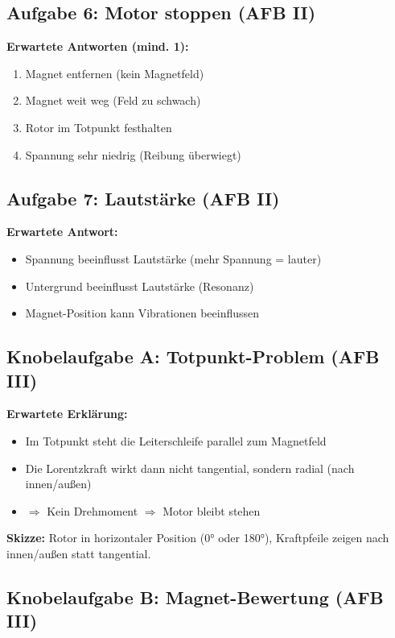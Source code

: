 \documentclass[11pt, a4paper]{article}
\begin{document}
\subsection*{Aufgabe 6: Motor stoppen (AFB II)}

\textbf{Erwartete Antworten (mind. 1):}
\begin{enumerate}[noitemsep]
    \item Magnet entfernen (kein Magnetfeld)
    \item Magnet weit weg (Feld zu schwach)
    \item Rotor im Totpunkt festhalten
    \item Spannung sehr niedrig (Reibung überwiegt)
\end{enumerate}

\subsection*{Aufgabe 7: Lautstärke (AFB II)}

\textbf{Erwartete Antwort:}
\begin{itemize}[noitemsep]
    \item Spannung beeinflusst Lautstärke (mehr Spannung = lauter)
    \item Untergrund beeinflusst Lautstärke (Resonanz)
    \item Magnet-Position kann Vibrationen beeinflussen
\end{itemize}

\subsection*{Knobelaufgabe A: Totpunkt-Problem (AFB III)}

\textbf{Erwartete Erklärung:}
\begin{itemize}[noitemsep]
    \item Im Totpunkt steht die Leiterschleife parallel zum Magnetfeld
    \item Die Lorentzkraft wirkt dann nicht tangential, sondern radial (nach innen/außen)
    \item $\Rightarrow$ Kein Drehmoment $\Rightarrow$ Motor bleibt stehen
\end{itemize}

\textbf{Skizze:} Rotor in horizontaler Position (0° oder 180°), Kraftpfeile zeigen nach innen/außen statt tangential.

\subsection*{Knobelaufgabe B: Magnet-Bewertung (AFB III)}
\end{document}
